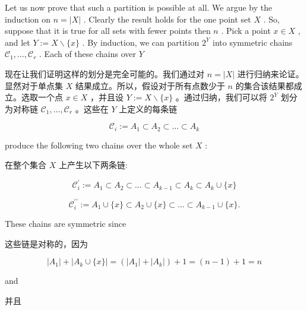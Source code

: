 \documentclass[10pt]{article}
\begin{document}
Let us now prove that such a partition is possible at all. We argue by the induction on \(n = \left| X\right|\) . Clearly the result holds for the one point set \(X\) . So, suppose that it is true for all sets with fewer points then \(n\) . Pick a point \(x \in  X\) , and let \(Y \mathrel{\text{ := }} X \smallsetminus  \{ x\}\) . By induction, we can partition \({2}^{Y}\) into symmetric chains \({\mathcal{C}}_{1},\ldots ,{\mathcal{C}}_{r}\) . Each of these chains over \(Y\)

\begin{tcolorbox}\relax
现在让我们证明这样的划分是完全可能的。我们通过对 \(n = \left| X\right|\) 进行归纳来论证。显然对于单点集 \(X\) 结果成立。所以，假设对于所有点数少于 \(n\) 的集合该结果都成立。选取一个点 \(x \in  X\) ，并且设 \(Y \mathrel{\text{ := }} X \smallsetminus  \{ x\}\) 。通过归纳，我们可以将 \({2}^{Y}\) 划分为对称链 \({\mathcal{C}}_{1},\ldots ,{\mathcal{C}}_{r}\) 。这些在 \(Y\) 上定义的每条链
\end{tcolorbox}

\[
{\mathcal{C}}_{i} \mathrel{\text{ := }} {A}_{1} \subset  {A}_{2} \subset  \ldots  \subset  {A}_{k}
\]

produce the following two chains over the whole set \(X\) :

\begin{tcolorbox}\relax
在整个集合 \(X\) 上产生以下两条链:
\end{tcolorbox}

\[
{\mathcal{C}}_{i}^{\prime } \mathrel{\text{ := }} {A}_{1} \subset  {A}_{2} \subset  \ldots  \subset  {A}_{k - 1} \subset  {A}_{k} \subset  {A}_{k} \cup  \{ x\}
\]

\[
{\mathcal{C}}_{i}^{\prime \prime } \mathrel{\text{ := }} {A}_{1} \cup  \{ x\}  \subset  {A}_{2} \cup  \{ x\}  \subset  \ldots  \subset  {A}_{k - 1} \cup  \{ x\} .
\]

These chains are symmetric since

\begin{tcolorbox}\relax
这些链是对称的，因为
\end{tcolorbox}

\[
\left| {A}_{1}\right|  + \left| {{A}_{k}\cup \{ x\} }\right|  = \left( {\left| {A}_{1}\right|  + \left| {A}_{k}\right| }\right)  + 1 = \left( {n - 1}\right)  + 1 = n
\]

and

\begin{tcolorbox}\relax
并且
\end{tcolorbox}
\end{document}
